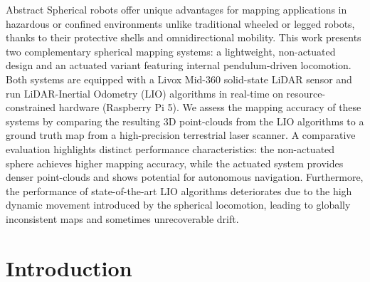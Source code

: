 \documentclass[english, bachelor, utf8]{base/thesis_telematics}
\begin{document}
\begin{prefacesection}{Abstract}
Spherical robots offer unique advantages for mapping applications in hazardous or confined environments unlike traditional wheeled or legged robots, thanks to their protective shells and omnidirectional mobility. 
This work presents two complementary spherical mapping systems: a lightweight, non-actuated design and an actuated variant featuring internal pendulum-driven locomotion. 
Both systems are equipped with a Livox Mid-360 solid-state LiDAR sensor and run LiDAR-Inertial Odometry (LIO) algorithms in real-time on resource-constrained hardware (Raspberry Pi 5). 
We assess the mapping accuracy of these systems by comparing the resulting 3D point-clouds from the LIO algorithms to a ground truth map from a high-precision terrestrial laser scanner.
A comparative evaluation highlights distinct performance characteristics: the non-actuated sphere achieves higher mapping accuracy, while the actuated system provides denser point-clouds and shows potential for autonomous navigation. 
Furthermore, the performance of state-of-the-art LIO algorithms deteriorates due to the high dynamic movement introduced by the spherical locomotion, leading to globally inconsistent maps and sometimes unrecoverable drift.
\end{prefacesection}
\cleardoublepage
\tableofcontents

\thispagestyle{empty}
\listoffigures
\listoftables
\newpage
{}

\startTextChapters %

\chapter{Introduction}
\label{ch:introduction}
\end{document}
